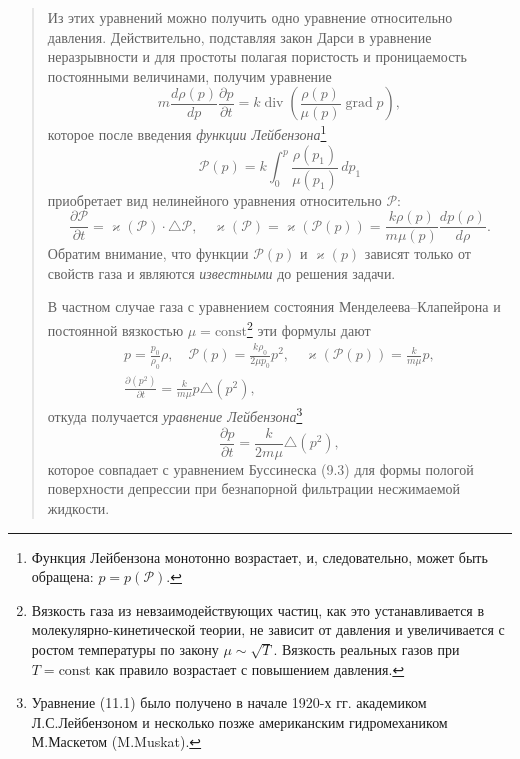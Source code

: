 \documentclass[12pt,a4paper]{article}
\DeclareMathOperator{\grad}{grad}
\DeclareMathOperator{\Div}{div}
\begin{document}
\begin{quote}\sloppy
Из этих уравнений можно получить одно уравнение относительно давления. Действительно, подставляя закон Дарси в уравнение неразрывности и для простоты полагая пористость и проницаемость постоянными величинами, получим уравнение
\[m\frac{d\rho(p)}{dp}\frac{\partial p}{\partial t}=k\Div\left(\frac{\rho(p)}{\mu(p)}\grad p\right),\]
которое после введения \textit{функции Лейбензона}\setcounter{footnote}{0}\footnote{Функция Лейбензона монотонно возрастает, и, следовательно, может быть обращена: $p=p(\mathscr{P})$.}
\[\mathscr{P}(p)=k\int_0^p\frac{\rho(p_1)}{\mu(p_1)}\,dp_1\]
приобретает вид нелинейного уравнения относительно $\mathscr{P}$:
\[\frac{\partial\mathscr{P}}{\partial t}=\varkappa(\mathscr{P})\cdot\triangle\mathscr{P},\quad\varkappa(\mathscr{P})=\varkappa(\mathscr{P}(p))=\frac{k\rho(p)}{m\mu(p)}\frac{dp(\rho)}{d\rho}.\]
Обратим внимание, что функции $\mathscr{P}(p)$ и $\varkappa(p)$ зависят только от свойств газа и являются \textit{известными} до решения задачи.

В частном случае газа с уравнением состояния Менделеева--Клапейрона и постоянной вязкостью $\mu=\mathrm{const}$\footnote{Вязкость газа из невзаимодействующих частиц, как это устанавливается в молекулярно-кинетической теории, не зависит от давления и увеличивается с ростом температуры по закону $\mu\sim\sqrt T$. Вязкость реальных газов при $T=\mathrm{const}$ как правило возрастает с повышением давления.} эти формулы дают
\[\begin{gathered}
p=\frac{p_0}{\rho_0}\rho,\quad\mathscr{P}(p)=\frac{k\rho_0}{2\mu p_0}p^2,\quad\varkappa(\mathscr{P}(p))=\frac{k}{m\mu}p,\\
\frac{\partial(p^2)}{\partial t}=\frac{k}{m\mu}p\triangle(p^2),
\end{gathered}\]
откуда получается \textit{уравнение Лейбензона}\footnote{Уравнение (11.1) было получено в начале 1920-х гг. академиком Л.С.Лейбензоном и несколько позже американским гидромехаником М.Маскетом (M.Muskat).}
\begin{equation}\frac{\partial p}{\partial t}=\frac{k}{2m\mu}\triangle(p^2),\tag{11.1}\label{q7:eq-11-1}\end{equation}
которое совпадает с уравнением Буссинеска (9.3) для формы пологой поверхности депрессии при безнапорной фильтрации несжимаемой жидкости.
\par\nobreak{}\par
\end{quote}
\endgroup
\end{document}
